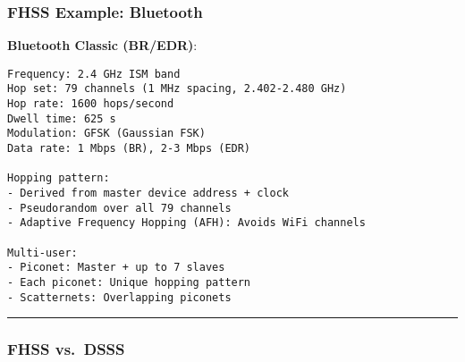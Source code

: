 \subsubsection{FHSS Example: Bluetooth}\label{fhss-example-bluetooth}

\textbf{Bluetooth Classic (BR/EDR)}:

\begin{verbatim}
Frequency: 2.4 GHz ISM band
Hop set: 79 channels (1 MHz spacing, 2.402-2.480 GHz)
Hop rate: 1600 hops/second
Dwell time: 625 s
Modulation: GFSK (Gaussian FSK)
Data rate: 1 Mbps (BR), 2-3 Mbps (EDR)

Hopping pattern:
- Derived from master device address + clock
- Pseudorandom over all 79 channels
- Adaptive Frequency Hopping (AFH): Avoids WiFi channels

Multi-user:
- Piconet: Master + up to 7 slaves
- Each piconet: Unique hopping pattern
- Scatternets: Overlapping piconets
\end{verbatim}

\begin{center}\rule{0.5\linewidth}{0.5pt}\end{center}

\subsubsection{FHSS vs.~DSSS}\label{fhss-vs.-dsss}

